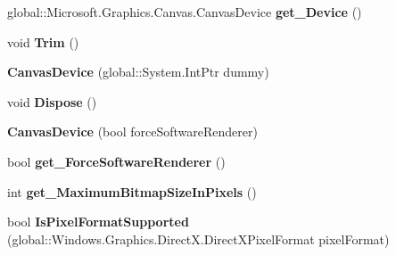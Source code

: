 \begin{DoxyCompactItemize}
global\+::\+Microsoft.\+Graphics.\+Canvas.\+Canvas\+Device {\bfseries get\+\_\+\+Device} ()
\item 
\mbox{\label{class_microsoft_1_1_graphics_1_1_canvas_1_1_canvas_device_a8dad763b64fdb6a584603b49fa0998ed}} 
void {\bfseries Trim} ()
\item 
\mbox{\label{class_microsoft_1_1_graphics_1_1_canvas_1_1_canvas_device_a0b344b18a95245487b5ec88f09efd311}} 
{\bfseries Canvas\+Device} (global\+::\+System.\+Int\+Ptr dummy)
\item 
\mbox{\label{class_microsoft_1_1_graphics_1_1_canvas_1_1_canvas_device_a9613f1f6bab02464823bd1e9d55c8374}} 
void {\bfseries Dispose} ()
\item 
\mbox{\label{class_microsoft_1_1_graphics_1_1_canvas_1_1_canvas_device_a92581b24422598de5948e89c9ba6eb53}} 
{\bfseries Canvas\+Device} (bool force\+Software\+Renderer)
\item 
\mbox{\label{class_microsoft_1_1_graphics_1_1_canvas_1_1_canvas_device_a0583e03d53b172ea1a1220e1df5b2616}} 
bool {\bfseries get\+\_\+\+Force\+Software\+Renderer} ()
\item 
\mbox{\label{class_microsoft_1_1_graphics_1_1_canvas_1_1_canvas_device_af71c8661ed6a571c7678dfcd97de7bc8}} 
int {\bfseries get\+\_\+\+Maximum\+Bitmap\+Size\+In\+Pixels} ()
\item 
\mbox{\label{class_microsoft_1_1_graphics_1_1_canvas_1_1_canvas_device_a01381b0e199054ee3d65ce1d6916972f}} 
bool {\bfseries Is\+Pixel\+Format\+Supported} (global\+::\+Windows.\+Graphics.\+Direct\+X.\+Direct\+X\+Pixel\+Format pixel\+Format)
\item 
\mbox{\label{class_microsoft_1_1_graphics_1_1_canvas_1_1_canvas_device_a05ed962d04bfea58842bb028fe6b8c4e}} 

\end{DoxyCompactItemize}
